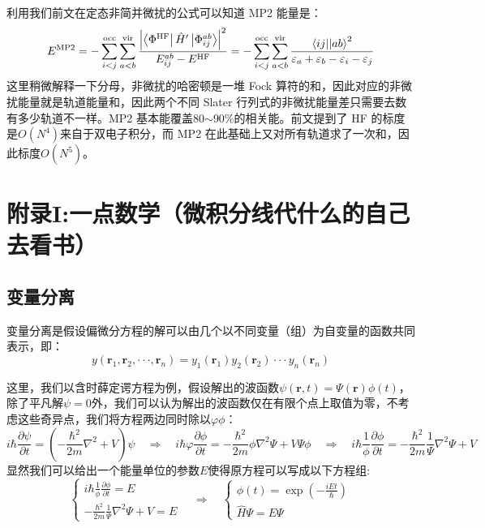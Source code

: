 利用我们前文在定态非简并微扰的公式可以知道 MP2 能量是：
\[E^{\rm{MP2}}=-\sum_{i<j}^{\rm{occ}}\sum_{a<b}^{\rm{vir}}\frac{\left|\bra{\Phi^{\rm{HF}}}\hat{H}'\ket{\Phi^{ab}_{ij}}\right|^2}{E^{ab}_{ij}-E^{\rm{HF}}}=-\sum_{i<j}^{\rm{occ}}\sum_{a<b}^{\rm{vir}}\frac{\bra{ij}\ket{|ab}^2}{\varepsilon_a+\varepsilon_b-\varepsilon_i-\varepsilon_j}\]
这里稍微解释一下分母，非微扰的哈密顿是一堆 Fock 算符的和，因此对应的非微扰能量就是轨道能量和，因此两个不同 Slater 行列式的非微扰能量差只需要去数有多少轨道不一样。MP2 基本能覆盖80$\sim$90\%的相关能。前文提到了 HF 的标度是$O(N^4)$来自于双电子积分，而 MP2 在此基础上又对所有轨道求了一次和，因此标度$O(N^5)$。

\section{附录I:一点数学（微积分线代什么的自己去看书）}
\subsection{变量分离}
变量分离是假设偏微分方程的解可以由几个以不同变量（组）为自变量的函数共同表示，即：
\[y(\bm{r}_1,\bm{r}_2,\cdot\cdot\cdot,\bm{r}_n)=y_1(\bm{r}_1)y_2(\bm{r}_2)\cdot\cdot\cdot y_n(\bm{r}_n)\]

这里，我们以含时薛定谔方程为例，假设解出的波函数$\psi(\bm{r},t)=\varPsi(\bm{r})\phi(t)$，除了平凡解$\psi=0$外，我们可以认为解出的波函数仅在有限个点上取值为零，不考虑这些奇异点，我们将方程两边同时除以$\varphi\phi$：
\[i \hbar \frac{\partial \psi}{\partial t}=\left (-\frac{\hbar^2}{2m}\nabla^2+V \right ) \psi \quad \Rightarrow \quad i \hbar \varphi \frac{\partial \phi}{\partial t}= -\frac{\hbar^2}{2m} \phi \nabla^2 \varPsi+V\varPsi\phi \quad \Rightarrow \quad i \hbar \frac{1}{\phi} \frac{\partial \phi}{\partial t}= -\frac{\hbar^2}{2m} \frac{1}{\varPsi} \nabla^2 \varPsi+V\]
显然我们可以给出一个能量单位的参数$E$使得原方程可以写成以下方程组:
\[\left\{
\begin{array}{r}
i\hbar\frac{1}{\phi}\frac{\partial\phi}{\partial t}=E\\
-\frac{\hbar^2}{2m}\frac{1}{\varPsi}\nabla^2\varPsi+V=E
\end{array} \right. \quad \Rightarrow \quad
\left\{
\begin{array}{l}
\phi(t)=\exp(-\frac{iEt}{\hbar})\\
\hat{H}\varPsi=E\varPsi
\end{array} \right.\]

